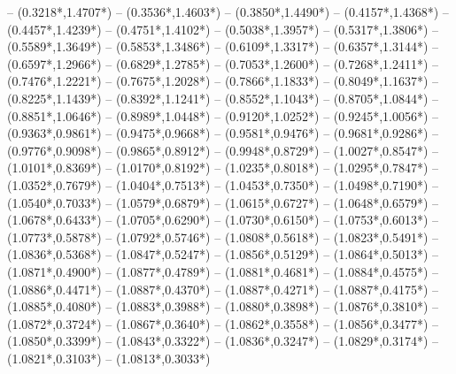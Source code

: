{	-- ({0.3218*\dx},{1.4707*\dy})
	-- ({0.3536*\dx},{1.4603*\dy})
	-- ({0.3850*\dx},{1.4490*\dy})
	-- ({0.4157*\dx},{1.4368*\dy})
	-- ({0.4457*\dx},{1.4239*\dy})
	-- ({0.4751*\dx},{1.4102*\dy})
	-- ({0.5038*\dx},{1.3957*\dy})
	-- ({0.5317*\dx},{1.3806*\dy})
	-- ({0.5589*\dx},{1.3649*\dy})
	-- ({0.5853*\dx},{1.3486*\dy})
	-- ({0.6109*\dx},{1.3317*\dy})
	-- ({0.6357*\dx},{1.3144*\dy})
	-- ({0.6597*\dx},{1.2966*\dy})
	-- ({0.6829*\dx},{1.2785*\dy})
	-- ({0.7053*\dx},{1.2600*\dy})
	-- ({0.7268*\dx},{1.2411*\dy})
	-- ({0.7476*\dx},{1.2221*\dy})
	-- ({0.7675*\dx},{1.2028*\dy})
	-- ({0.7866*\dx},{1.1833*\dy})
	-- ({0.8049*\dx},{1.1637*\dy})
	-- ({0.8225*\dx},{1.1439*\dy})
	-- ({0.8392*\dx},{1.1241*\dy})
	-- ({0.8552*\dx},{1.1043*\dy})
	-- ({0.8705*\dx},{1.0844*\dy})
	-- ({0.8851*\dx},{1.0646*\dy})
	-- ({0.8989*\dx},{1.0448*\dy})
	-- ({0.9120*\dx},{1.0252*\dy})
	-- ({0.9245*\dx},{1.0056*\dy})
	-- ({0.9363*\dx},{0.9861*\dy})
	-- ({0.9475*\dx},{0.9668*\dy})
	-- ({0.9581*\dx},{0.9476*\dy})
	-- ({0.9681*\dx},{0.9286*\dy})
	-- ({0.9776*\dx},{0.9098*\dy})
	-- ({0.9865*\dx},{0.8912*\dy})
	-- ({0.9948*\dx},{0.8729*\dy})
	-- ({1.0027*\dx},{0.8547*\dy})
	-- ({1.0101*\dx},{0.8369*\dy})
	-- ({1.0170*\dx},{0.8192*\dy})
	-- ({1.0235*\dx},{0.8018*\dy})
	-- ({1.0295*\dx},{0.7847*\dy})
	-- ({1.0352*\dx},{0.7679*\dy})
	-- ({1.0404*\dx},{0.7513*\dy})
	-- ({1.0453*\dx},{0.7350*\dy})
	-- ({1.0498*\dx},{0.7190*\dy})
	-- ({1.0540*\dx},{0.7033*\dy})
	-- ({1.0579*\dx},{0.6879*\dy})
	-- ({1.0615*\dx},{0.6727*\dy})
	-- ({1.0648*\dx},{0.6579*\dy})
	-- ({1.0678*\dx},{0.6433*\dy})
	-- ({1.0705*\dx},{0.6290*\dy})
	-- ({1.0730*\dx},{0.6150*\dy})
	-- ({1.0753*\dx},{0.6013*\dy})
	-- ({1.0773*\dx},{0.5878*\dy})
	-- ({1.0792*\dx},{0.5746*\dy})
	-- ({1.0808*\dx},{0.5618*\dy})
	-- ({1.0823*\dx},{0.5491*\dy})
	-- ({1.0836*\dx},{0.5368*\dy})
	-- ({1.0847*\dx},{0.5247*\dy})
	-- ({1.0856*\dx},{0.5129*\dy})
	-- ({1.0864*\dx},{0.5013*\dy})
	-- ({1.0871*\dx},{0.4900*\dy})
	-- ({1.0877*\dx},{0.4789*\dy})
	-- ({1.0881*\dx},{0.4681*\dy})
	-- ({1.0884*\dx},{0.4575*\dy})
	-- ({1.0886*\dx},{0.4471*\dy})
	-- ({1.0887*\dx},{0.4370*\dy})
	-- ({1.0887*\dx},{0.4271*\dy})
	-- ({1.0887*\dx},{0.4175*\dy})
	-- ({1.0885*\dx},{0.4080*\dy})
	-- ({1.0883*\dx},{0.3988*\dy})
	-- ({1.0880*\dx},{0.3898*\dy})
	-- ({1.0876*\dx},{0.3810*\dy})
	-- ({1.0872*\dx},{0.3724*\dy})
	-- ({1.0867*\dx},{0.3640*\dy})
	-- ({1.0862*\dx},{0.3558*\dy})
	-- ({1.0856*\dx},{0.3477*\dy})
	-- ({1.0850*\dx},{0.3399*\dy})
	-- ({1.0843*\dx},{0.3322*\dy})
	-- ({1.0836*\dx},{0.3247*\dy})
	-- ({1.0829*\dx},{0.3174*\dy})
	-- ({1.0821*\dx},{0.3103*\dy})
	-- ({1.0813*\dx},{0.3033*\dy})
}

